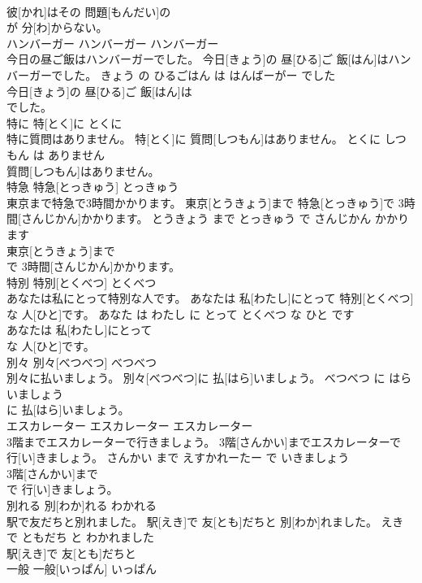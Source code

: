 \documentclass[8pt]{extreport}
\begin{document}
\begin{CJK}{UTF8}{min}
\\	彼[かれ]はその 問題[もんだい]の
\\	が 分[わ]からない。		
\\	ハンバーガー	ハンバーガー	ハンバーガー	
\\	今日の昼ご飯はハンバーガーでした。	今日[きょう]の 昼[ひる]ご 飯[はん]はハンバーガーでした。	きょう の ひるごはん は はんばーがー でした	
\\	今日[きょう]の 昼[ひる]ご 飯[はん]は
\\	でした。		
\\	特に	特[とく]に	とくに	
\\	特に質問はありません。	特[とく]に 質問[しつもん]はありません。	とくに しつもん は ありません	
\\	質問[しつもん]はありません。		
\\	特急	特急[とっきゅう]	とっきゅう	
\\	東京まで特急で3時間かかります。	東京[とうきょう]まで 特急[とっきゅう]で 3時間[さんじかん]かかります。	とうきょう まで とっきゅう で さんじかん かかります	
\\	東京[とうきょう]まで
\\	で 3時間[さんじかん]かかります。		
\\	特別	特別[とくべつ]	とくべつ	
\\	あなたは私にとって特別な人です。	あなたは 私[わたし]にとって 特別[とくべつ]な 人[ひと]です。	あなた は わたし に とって とくべつ な ひと です	
\\	あなたは 私[わたし]にとって
\\	な 人[ひと]です。		
\\	別々	別々[べつべつ]	べつべつ	
\\	別々に払いましょう。	別々[べつべつ]に 払[はら]いましょう。	べつべつ に はらいましょう	
\\	に 払[はら]いましょう。		
\\	エスカレーター	エスカレーター	エスカレーター	
\\	3階までエスカレーターで行きましょう。	3階[さんかい]までエスカレーターで 行[い]きましょう。	さんかい まで えすかれーたー で いきましょう	
\\	3階[さんかい]まで
\\	で 行[い]きましょう。		
\\	別れる	別[わか]れる	わかれる	
\\	駅で友だちと別れました。	駅[えき]で 友[とも]だちと 別[わか]れました。	えき で ともだち と わかれました	
\\	駅[えき]で 友[とも]だちと
\\	一般	一般[いっぱん]	いっぱん	

\end{CJK}
\end{document}
